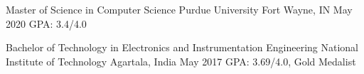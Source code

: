 
\begin{cventries}
  \cventry
    {Master of Science in Computer Science} %
    {Purdue University} %
    {Fort Wayne, IN} %
    {May 2020} %
    {GPA: 3.4/4.0} %
\end{cventries}

\begin{cventries}
  \cventry
    {Bachelor of Technology in Electronics and Instrumentation Engineering} %
    {National Institute of Technology} %
    {Agartala, India} %
    {May 2017} %
    {GPA: 3.69/4.0, Gold Medalist} %
\end{cventries}
